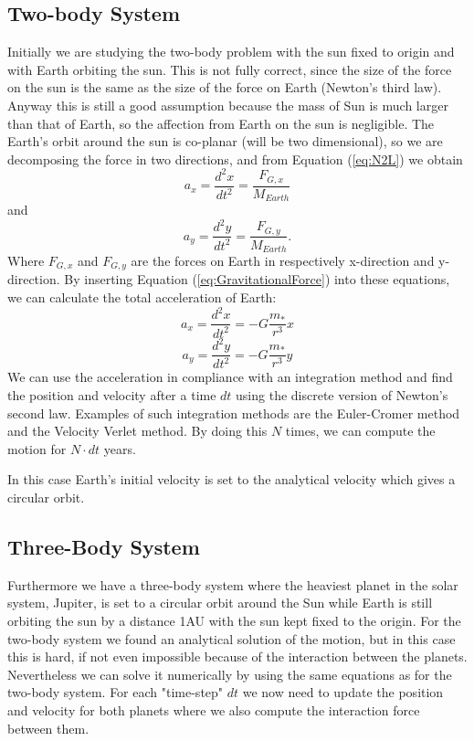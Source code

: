 \documentclass[norsk,a4paper,12pt]{article}
\begin{document}
\subsection{Two-body System}
Initially we are studying the two-body problem with the sun fixed to origin and with Earth orbiting the sun. This is not fully correct, since the size of the force on the sun is the same as the size of the force on Earth (Newton's third law). Anyway this is still a good assumption because the mass of Sun is much larger than that of Earth, so the affection from Earth on the sun is negligible. The Earth's orbit around the sun is co-planar (will be two dimensional), so we are decomposing the force in two directions, and from Equation (\ref{eq:N2L}) we obtain
\begin{equation}
a_x=\frac{d^2x}{dt^2}=\frac{F_{G,x}}{M_{Earth}}
\end{equation}
and
\begin{equation}
a_y=\frac{d^2y}{dt^2}=\frac{F_{G,y}}{M_{Earth}}.
\end{equation}
Where $F_{G,x}$ and $F_{G,y}$ are the forces on Earth in respectively x-direction and y-direction. By inserting Equation (\ref{eq:GravitationalForce}) into these equations, we can calculate the total acceleration of Earth:
\begin{equation}
a_x=\frac{d^2x}{dt^2}=-G\frac{m_*}{r^3}x
\end{equation}
\begin{equation}
a_y=\frac{d^2y}{dt^2}=-G\frac{m_*}{r^3}y
\end{equation}
We can use the acceleration in compliance with an integration method and find the position and velocity after a time $dt$ using the discrete version of Newton's second law. Examples of such integration methods are the Euler-Cromer method and the Velocity Verlet method. By doing this $N$ times, we can compute the motion for $N\cdot dt$ years. 

 In this case Earth's initial velocity is set to the analytical velocity which gives a circular orbit. 

\subsection{Three-Body System}
Furthermore we have a three-body system where the heaviest planet in the solar system, Jupiter, is set to a circular orbit around the Sun while Earth is still orbiting the sun by a distance 1AU with the sun kept fixed to the origin. For the two-body system we found an analytical solution of the motion, but in this case this is hard, if not even impossible because of the interaction between the planets. Nevertheless we can solve it numerically by using the same equations as for the two-body system. For each "time-step" $dt$ we now need to update the position and velocity for both planets where we also compute the interaction force between them. 
\end{document}
